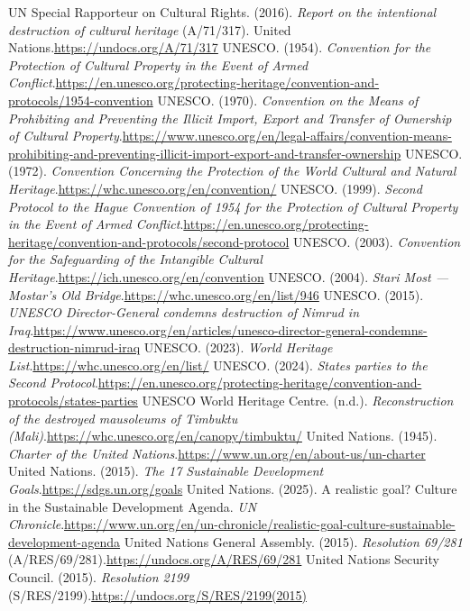 \begin{referencelist}
   UN Special Rapporteur on Cultural Rights. (2016). \emph{Report on the intentional destruction of cultural heritage} (A/71/317). United Nations.\url{https://undocs.org/A/71/317}
   UNESCO. (1954). \emph{Convention for the Protection of Cultural Property in the Event of Armed Conflict}.\url{https://en.unesco.org/protecting-heritage/convention-and-protocols/1954-convention}
   UNESCO. (1970). \emph{Convention on the Means of Prohibiting and Preventing the Illicit Import, Export and Transfer of Ownership of Cultural Property}.\url{https://www.unesco.org/en/legal-affairs/convention-means-prohibiting-and-preventing-illicit-import-export-and-transfer-ownership}
   UNESCO. (1972). \emph{Convention Concerning the Protection of the World Cultural and Natural Heritage}.\url{https://whc.unesco.org/en/convention/}
   UNESCO. (1999). \emph{Second Protocol to the Hague Convention of 1954 for the Protection of Cultural Property in the Event of Armed Conflict}.\url{https://en.unesco.org/protecting-heritage/convention-and-protocols/second-protocol}
   UNESCO. (2003). \emph{Convention for the Safeguarding of the Intangible Cultural Heritage}.\url{https://ich.unesco.org/en/convention}
   UNESCO. (2004). \emph{Stari Most — Mostar's Old Bridge}.\url{https://whc.unesco.org/en/list/946}
   UNESCO. (2015). \emph{UNESCO Director-General condemns destruction of Nimrud in Iraq}.\url{https://www.unesco.org/en/articles/unesco-director-general-condemns-destruction-nimrud-iraq}
   UNESCO. (2023). \emph{World Heritage List}.\url{https://whc.unesco.org/en/list/}
   UNESCO. (2024). \emph{States parties to the Second Protocol}.\url{https://en.unesco.org/protecting-heritage/convention-and-protocols/states-parties}
   UNESCO World Heritage Centre. (n.d.). \emph{Reconstruction of the destroyed mausoleums of Timbuktu (Mali)}.\url{https://whc.unesco.org/en/canopy/timbuktu/}
   United Nations. (1945). \emph{Charter of the United Nations}.\url{https://www.un.org/en/about-us/un-charter}
   United Nations. (2015). \emph{The 17 Sustainable Development Goals}.\url{https://sdgs.un.org/goals}
   United Nations. (2025). A realistic goal? Culture in the Sustainable Development Agenda. \emph{UN Chronicle}.\url{https://www.un.org/en/un-chronicle/realistic-goal-culture-sustainable-development-agenda}
   United Nations General Assembly. (2015). \emph{Resolution 69/281} (A/RES/69/281).\url{https://undocs.org/A/RES/69/281}
   United Nations Security Council. (2015). \emph{Resolution 2199} (S/RES/2199).\url{https://undocs.org/S/RES/2199(2015)}

\end{referencelist}
